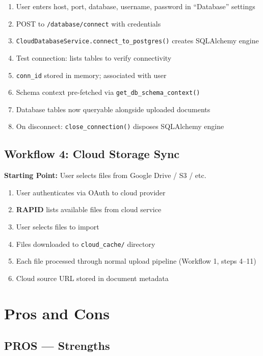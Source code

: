 \documentclass[12pt, a4paper, oneside]{report}
\newcommand{\kw}[1]{\texttt{\small #1}}
\newcommand{\rapidsys}{\textbf{\color{rapidblue}RAPID}}
\begin{document}
\begin{enumerate}
  \item User enters host, port, database, username, password in ``Database'' settings
  \item POST to \kw{/database/connect} with credentials
  \item \kw{CloudDatabaseService.connect\_to\_postgres()} creates SQLAlchemy engine
  \item Test connection: lists tables to verify connectivity
  \item \kw{conn\_id} stored in memory; associated with user
  \item Schema context pre-fetched via \kw{get\_db\_schema\_context()}
  \item Database tables now queryable alongside uploaded documents
  \item On disconnect: \kw{close\_connection()} disposes SQLAlchemy engine
\end{enumerate}

\section{Workflow 4: Cloud Storage Sync}

\textbf{Starting Point:} User selects files from Google Drive / S3 / etc.

\begin{enumerate}
  \item User authenticates via OAuth to cloud provider
  \item \rapidsys{} lists available files from cloud service
  \item User selects files to import
  \item Files downloaded to \kw{cloud\_cache/} directory
  \item Each file processed through normal upload pipeline (Workflow 1, steps 4--11)
  \item Cloud source URL stored in document metadata
\end{enumerate}

\chapter{Pros and Cons}

\section{PROS — Strengths}
\end{document}
